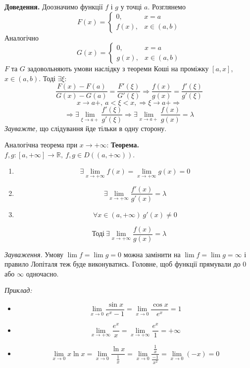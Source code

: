 \documentclass[12pt]{report}
\begin{document}
\textbf{Доведення.} Доозначимо функції $f$ і  $g$ у точці $a$. Розглянемо 
$$F(x) = \begin{cases} 0,& x = a \\
						f(x),& x \in (a,b)\end{cases}$$
Аналогічно
$$G(x) = \begin{cases} 0,& x = a \\
						g(x),& x \in (a,b)\end{cases}$$
$F$ та $G$ задовольняють умови наслідку з теореми Коші на проміжку $[a,x]$, $x \in (a,b)$. Тоді $\exists \xi:$
$$\frac{F(x) - F(a)}{G(x) - G(a)} = \frac{F'(\xi)}{G'(\xi)} \Longrightarrow \frac{f(x)}{g(x)} = \frac{f'(\xi)}{g'(\xi)}$$
$$x \to a+,\ a < \xi < x, \Longrightarrow \xi \to a+ \Longrightarrow $$
$$\Longrightarrow \exists \lim_{\xi \to a+}\frac{f'(\xi)}{g'(\xi)} \Longrightarrow \exists \lim_{x\to a+}\frac{f(x)}{g(x)} = \lambda$$
\textit{Зауважте,} що слідування йде тільки в одну сторону.

\vspace{3mm}

Аналогічна теорема при $x \to +\infty$:
\textbf{Теорема.} $f,g : [a, +\infty] \to \mathbb{R},\ f,g \in D((a, +\infty))$.
\begin{enumerate}
\item $$\exists \lim_{x \to +\infty}f(x) = \lim_{x\to +\infty}g(x) = 0$$
\item $$\exists \lim_{x\to +\infty}\frac{f'(x)}{g'(x)} = \lambda$$
\item $$\forall x \in (a, +\infty)\ g'(x) \neq 0$$
\end{enumerate}  
$$\textrm{Тоді}\ \exists \lim_{x\to +\infty}\frac{f(x)}{g(x)} = \lambda$$

\textit{Зауваження.} Умову $\lim f = \lim g = 0$ можна замінити на $\lim f = \lim g = \infty$ і правило Лопіталя теж буде виконуватись. Головне, щоб функції прямували до $0$ або $\infty$ одночасно.

\textit{Приклад:}
\begin{itemize}
\item $$\lim_{x\to 0}\frac{\sin x}{e^x - 1} = \lim_{x\to 0}\frac{\cos x}{e^x} = 1$$
\item $$\lim_{x\to +\infty}\frac{e^x}{x} = \lim_{x \to +\infty}\frac{e^x}{1} = +\infty$$
\item $$\lim_{x\to 0}x \ln x = \lim_{x \to 0}\frac{\ln x}{\frac{1}{x}} = \lim_{x\to 0}\frac{\frac{1}{x}}{\frac{-1}{x^2}} = \lim_{x\to 0}(-x) = 0$$
\end{itemize}
\end{document}
